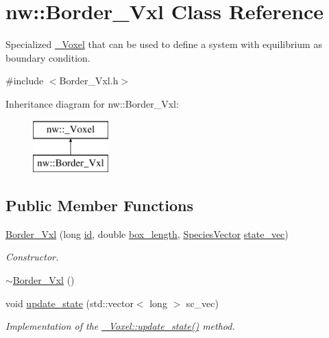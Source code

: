 \hypertarget{classnw_1_1_border___vxl}{\section{nw\+:\+:Border\+\_\+\+Vxl Class Reference}
\label{classnw_1_1_border___vxl}
}


Specialized \hyperlink{classnw_1_1___voxel}{\+\_\+\+Voxel} that can be used to define a system with equilibrium as boundary condition.  




{\ttfamily \#include $<$Border\+\_\+\+Vxl.\+h$>$}

Inheritance diagram for nw\+:\+:Border\+\_\+\+Vxl\+:\begin{figure}[H]
\begin{center}
\leavevmode
\includegraphics[height=2.000000cm]{d3/d72/classnw_1_1_border___vxl}
\end{center}
\end{figure}
\subsection*{Public Member Functions}
\begin{DoxyCompactItemize}
\item 
\hyperlink{classnw_1_1_border___vxl_a9fec31173af0a4b458af9670d274c7c9}{Border\+\_\+\+Vxl} (long \hyperlink{classnw_1_1___voxel_a01b73aff9af26230df4c483c5bd81896}{id}, double \hyperlink{classnw_1_1___voxel_ad9c3dbd0ea989af6ba7e1b5e09f6a989}{box\+\_\+length}, \hyperlink{namespacenw_a68aa8285591d78ebfc793c531bd43a23}{Species\+Vector} \hyperlink{classnw_1_1___voxel_a7762f59802c2a0b54bd18acbf803ff34}{state\+\_\+vec})
\begin{DoxyCompactList}\small\item\em Constructor. \end{DoxyCompactList}\item 
\hyperlink{classnw_1_1_border___vxl_a6874c3e65b625da883448d2c6811a0b7}{$\sim$\+Border\+\_\+\+Vxl} ()
\item 
void \hyperlink{classnw_1_1_border___vxl_aa7bd84871cf4a9781a535a0a1922dcc8}{update\+\_\+state} (std\+::vector$<$ long $>$ sc\+\_\+vec)
\begin{DoxyCompactList}\small\item\em Implementation of the \hyperlink{classnw_1_1___voxel_a5842ac3c24bda907204852db0cf46810}{\+\_\+\+Voxel\+::update\+\_\+state()} method. \end{DoxyCompactList}\end{DoxyCompactItemize}
